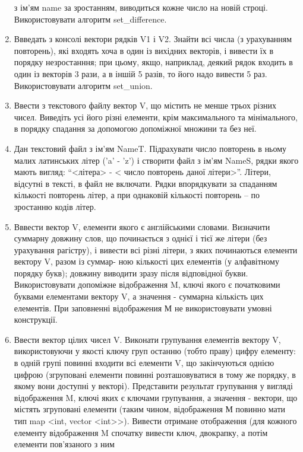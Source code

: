 \documentclass[]{article}
\begin{document}
\begin{enumerate}
  з ім'ям name за зростанням, виводиться кожне число на новій строці.
  Використовувати алгоритм set\_difference.
\item
  Ввведать з консолі вектори рядків V1 і V2. Знайти всі числа (з
  урахуванням повторень), які входять хоча в один із вихідних векторів,
  і вивести їх в порядку незростанння; при цьому, якщо, наприклад,
  деякий рядок входить в один із векторів 3 рази, а в іншій 5 разів, то
  його надо вивести 5 раз. Використовувати алгоритм set\_union.
\item
  Ввести з текстового файлу вектор V, що містить не менше трьох різних
  чисел. Виведіть усі його різні елементи, крім максимального та
  мінімального, в порядку спадання за допомогою допоміжної множини та
  без неї.
\item
  Дан текстовий файл з ім'ям NameT. Підрахувати число повторень в ньому
  малих латинських літер ('a' - 'z') і створити файл з ім'ям NameS,
  рядки якого мають вигляд: ``\textless{}літера\textgreater{} -
  \textless{} число повторень даної літери\textgreater{}''. Літери,
  відсутні в тексті, в файл не включати. Рядки впорядкувати за спаданням
  кількості повторень літер, а при однаковій кількості повторень -- по
  зростанню кодів літер.
\item
  Вввести вектор V, елементи якого є англійськими словами. Визначити
  суммарну довжину слов, що починається з однієї і тієї же літери (без
  урахування рагістру), і вивести всі різні літери, з яких починаються
  елементи вектору V, разом із суммар- ною кількості цих елементів (у
  алфавітному порядку букв); довжину виводити зразу після відповідної
  букви. Використовувати допоміжне відображення M, ключі якого є
  початковими буквами елементами вектору V, а значення - суммарна
  кількість цих елементів. При заповненні відображения М не
  використовувати умовні конструкції.
\item
  Ввести вектор цілих чисел V. Виконати групування елементів вектору V,
  використовуючи у якості ключу груп останню (тобто праву) цифру
  елементу: в одній групі повинні входити всі елементи V, що
  закінчуються однією цифрою (згруповані елементи повинні
  розташовуватися в тому же порядку, в якому вони доступні у векторі).
  Представити результат групування у вигляді відображення M, ключі яких
  є ключами групування, а значення - вектори, що містять згруповані
  елементи (таким чином, відображення М повинно мати тип map
  \textless{}int, vector \textless{}int\textgreater{}\textgreater{}).
  Вивести отримане отображення (для кожного елементу відображення M
  спочатку вивести ключ, двокрапку, а потім елементи пов'язаного з ним

\end{enumerate}
\end{document}
